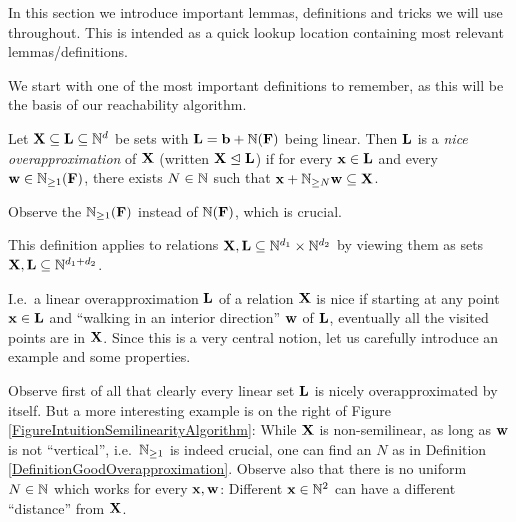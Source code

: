 
In this section we introduce important lemmas, definitions and tricks we will use throughout. This is intended as a quick lookup location containing most relevant lemmas/definitions.

We start with one of the most important definitions to remember, as this will be the basis of our reachability algorithm.

\begin{definition} \label{DefinitionGoodOverapproximation}
Let \(\mathbf{X} \subseteq \mathbf{L} \subseteq \mathbb{N}^{d}\) be sets with \(\mathbf{L}=\mathbf{b}+\mathbb{N}(\mathbf{F})\) being linear. Then \(\mathbf{L}\) is a \emph{nice overapproximation} of \(\mathbf{X}\) (written \(\mathbf{X} \trianglelefteq \mathbf{L}\)) if for every \(\mathbf{x} \in \mathbf{L}\) and every \(\mathbf{w} \in \mathbb{N}_{\geq 1}(\mathbf{F})\), there exists \(N \in \mathbb{N}\) such that \(\mathbf{x}+\mathbb{N}_{\geq N}\mathbf{w} \subseteq \mathbf{X}\). 

Observe the \(\mathbb{N}_{\geq 1}(\mathbf{F})\) instead of \(\mathbb{N}(\mathbf{F})\), which is crucial.

This definition applies to relations \(\mathbf{X}, \mathbf{L} \subseteq \mathbb{N}^{d_1} \times \mathbb{N}^{d_2}\) by viewing them as sets \(\mathbf{X}, \mathbf{L} \subseteq \mathbb{N}^{d_1+d_2}\).
\end{definition}

I.e.\ a linear overapproximation \(\mathbf{L}\) of a relation \(\mathbf{X}\) is nice if starting at any point \(\mathbf{x} \in \mathbf{L}\) and ``walking in an interior direction'' \(\mathbf{w}\) of \(\mathbf{L}\), eventually all the visited points are in \(\mathbf{X}\). Since this is a very central notion, let us carefully introduce an example and some properties.

Observe first of all that clearly every linear set \(\mathbf{L}\) is nicely overapproximated by itself. But a more interesting example is on the right of Figure \ref{FigureIntuitionSemilinearityAlgorithm}: While \(\mathbf{X}\) is non-semilinear, as long as \(\mathbf{w}\) is not ``vertical'', i.e.\ \(\mathbb{N}_{\geq 1}\) is indeed crucial, one can find an \(N\) as in Definition \ref{DefinitionGoodOverapproximation}. Observe also that there is no uniform \(N \in \mathbb{N}\) which works for every \(\mathbf{x}, \mathbf{w}\): Different \(\mathbf{x} \in \mathbb{N}^2\) can have a different ``distance'' from \(\mathbf{X}\).

